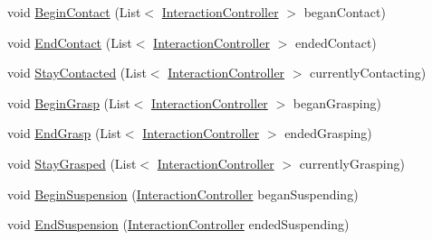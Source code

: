 \begin{DoxyCompactItemize}
\item 
void \mbox{\hyperlink{interface_leap_1_1_unity_1_1_interaction_1_1_i_interaction_behaviour_a577c47a20b0f2ae933bd20d7f1b47498}{Begin\+Contact}} (List$<$ \mbox{\hyperlink{class_leap_1_1_unity_1_1_interaction_1_1_interaction_controller}{Interaction\+Controller}} $>$ began\+Contact)
\item 
void \mbox{\hyperlink{interface_leap_1_1_unity_1_1_interaction_1_1_i_interaction_behaviour_a5a85de0cc00d9c393b84c7fec456e506}{End\+Contact}} (List$<$ \mbox{\hyperlink{class_leap_1_1_unity_1_1_interaction_1_1_interaction_controller}{Interaction\+Controller}} $>$ ended\+Contact)
\item 
void \mbox{\hyperlink{interface_leap_1_1_unity_1_1_interaction_1_1_i_interaction_behaviour_a5a1fd5a7196c9252624de033c80b25f8}{Stay\+Contacted}} (List$<$ \mbox{\hyperlink{class_leap_1_1_unity_1_1_interaction_1_1_interaction_controller}{Interaction\+Controller}} $>$ currently\+Contacting)
\item 
void \mbox{\hyperlink{interface_leap_1_1_unity_1_1_interaction_1_1_i_interaction_behaviour_af603fe6d03b61ae9e5d05c7809b05160}{Begin\+Grasp}} (List$<$ \mbox{\hyperlink{class_leap_1_1_unity_1_1_interaction_1_1_interaction_controller}{Interaction\+Controller}} $>$ began\+Grasping)
\item 
void \mbox{\hyperlink{interface_leap_1_1_unity_1_1_interaction_1_1_i_interaction_behaviour_a337f8e0a31f507a3fcd2bdcf1abb9df1}{End\+Grasp}} (List$<$ \mbox{\hyperlink{class_leap_1_1_unity_1_1_interaction_1_1_interaction_controller}{Interaction\+Controller}} $>$ ended\+Grasping)
\item 
void \mbox{\hyperlink{interface_leap_1_1_unity_1_1_interaction_1_1_i_interaction_behaviour_a8c95d4e968d94cec18ac2038e914931e}{Stay\+Grasped}} (List$<$ \mbox{\hyperlink{class_leap_1_1_unity_1_1_interaction_1_1_interaction_controller}{Interaction\+Controller}} $>$ currently\+Grasping)
\item 
void \mbox{\hyperlink{interface_leap_1_1_unity_1_1_interaction_1_1_i_interaction_behaviour_a2e68a48e5b84237fa5963406b08e3eba}{Begin\+Suspension}} (\mbox{\hyperlink{class_leap_1_1_unity_1_1_interaction_1_1_interaction_controller}{Interaction\+Controller}} began\+Suspending)
\item 
void \mbox{\hyperlink{interface_leap_1_1_unity_1_1_interaction_1_1_i_interaction_behaviour_a7be9c13a479bebdd78fbfcdd67a2304f}{End\+Suspension}} (\mbox{\hyperlink{class_leap_1_1_unity_1_1_interaction_1_1_interaction_controller}{Interaction\+Controller}} ended\+Suspending)
\end{DoxyCompactItemize}
